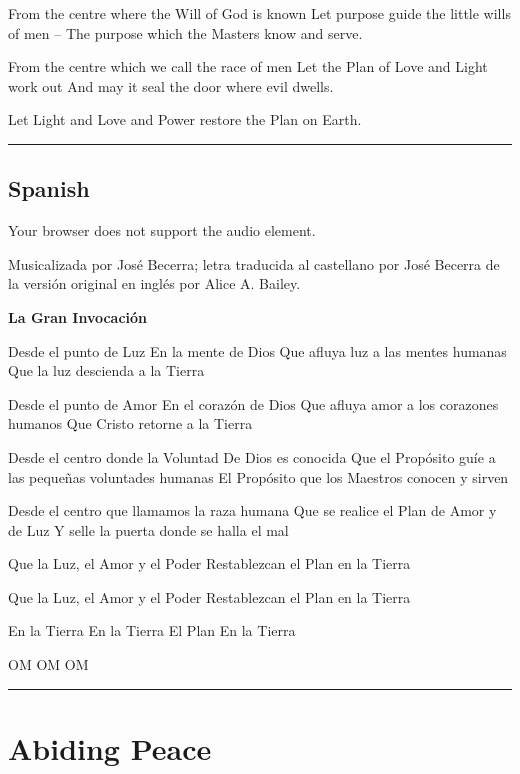 \documentclass[
]{book}
\begin{document}
From the centre where the Will of God is known
Let purpose guide the little wills of men --
The purpose which the Masters know and serve.

From the centre which we call the race of men
Let the Plan of Love and Light work out
And may it seal the door where evil dwells.

Let Light and Love and Power restore the Plan on Earth.

\begin{center}\rule{0.5\linewidth}{0.5pt}\end{center}

\hypertarget{spanish}{%
\section{Spanish}\label{spanish}}

Your browser does not support the audio element.

Musicalizada por José Becerra; letra traducida al castellano por José Becerra de la versión original en inglés por Alice A. Bailey.

\textbf{La Gran Invocación}

Desde el punto de Luz
En la mente de Dios
Que afluya luz a las mentes humanas
Que la luz descienda a la Tierra

Desde el punto de Amor
En el corazón de Dios
Que afluya amor a los corazones humanos
Que Cristo retorne a la Tierra

Desde el centro donde la Voluntad
De Dios es conocida
Que el Propósito guíe a las pequeñas voluntades humanas
El Propósito que los Maestros conocen y sirven

Desde el centro que llamamos la raza humana
Que se realice el Plan de Amor y de Luz
Y selle la puerta donde se halla el mal

Que la Luz, el Amor y el Poder
Restablezcan el Plan en la Tierra

Que la Luz, el Amor y el Poder
Restablezcan el Plan en la Tierra

En la Tierra
En la Tierra
El Plan
En la Tierra

OM OM OM

\begin{center}\rule{0.5\linewidth}{0.5pt}\end{center}

\hypertarget{abiding-peace}{%
\chapter{Abiding Peace}\label{abiding-peace}}
\end{document}
